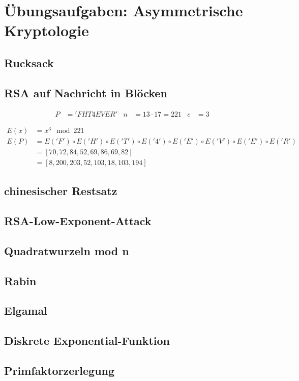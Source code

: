 \section{Übungsaufgaben: Asymmetrische Kryptologie}
\subsection{Rucksack}
\subsection{RSA auf Nachricht in Blöcken}

\begin{align}
  P &= 'FHT4EVER'  &
  n &= 13 \cdot 17 = 221 & e &= 3
\end{align}

\begin{align}
	E(x) &=  x^3 \mod 221 \\
	E(P) &=  E('F') \circ E('H')\circ E('T')\circ E('4')\circ E('E')\circ E('V')\circ E('E')\circ E('R')\\
		 &=  [70, 72, 84, 52, 69, 86, 69, 82]     														\\
		 &=  [8, 200, 203, 52, 103, 18, 103, 194]
\end{align}


\subsection{chinesischer Restsatz}
\subsection{RSA-Low-Exponent-Attack}
\subsection{Quadratwurzeln mod n}
\subsection{Rabin}
\subsection{Elgamal}
\subsection{Diskrete Exponential-Funktion}
\subsection{Primfaktorzerlegung}
